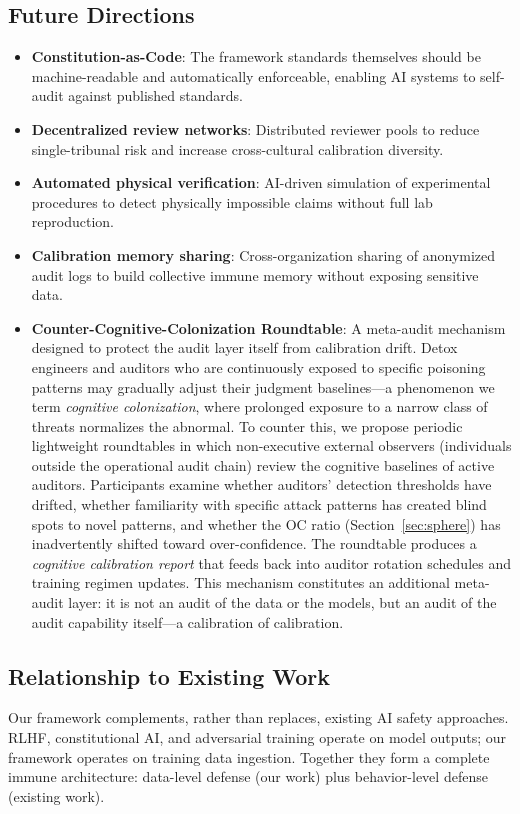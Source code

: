 \documentclass[11pt]{article}
\begin{document}
\subsection{Future Directions}
\begin{itemize}
  \item \textbf{Constitution-as-Code}: The framework standards themselves should be 
    machine-readable and automatically enforceable, enabling AI systems to self-audit 
    against published standards.
  \item \textbf{Decentralized review networks}: Distributed reviewer pools to reduce 
    single-tribunal risk and increase cross-cultural calibration diversity.
  \item \textbf{Automated physical verification}: AI-driven simulation of experimental 
    procedures to detect physically impossible claims without full lab reproduction.
  \item \textbf{Calibration memory sharing}: Cross-organization sharing of anonymized 
    audit logs to build collective immune memory without exposing sensitive data.
  \item \textbf{Counter-Cognitive-Colonization Roundtable}: A meta-audit mechanism 
    designed to protect the audit layer itself from calibration drift. Detox engineers 
    and auditors who are continuously exposed to specific poisoning patterns may 
    gradually adjust their judgment baselines—a phenomenon we term 
    \textit{cognitive colonization}, where prolonged exposure to a narrow class of 
    threats normalizes the abnormal. To counter this, we propose periodic lightweight 
    roundtables in which non-executive external observers (individuals outside the 
    operational audit chain) review the cognitive baselines of active auditors. 
    Participants examine whether auditors' detection thresholds have drifted, whether 
    familiarity with specific attack patterns has created blind spots to novel patterns, 
    and whether the OC ratio (Section~\ref{sec:sphere}) has inadvertently shifted 
    toward over-confidence. The roundtable produces a \textit{cognitive calibration 
    report} that feeds back into auditor rotation schedules and training regimen 
    updates. This mechanism constitutes an additional meta-audit layer: it is not 
    an audit of the data or the models, but an audit of the audit capability itself—a 
    calibration of calibration.
\end{itemize}

\subsection{Relationship to Existing Work}
Our framework complements, rather than replaces, existing AI safety approaches. RLHF, 
constitutional AI, and adversarial training operate on model outputs; our framework 
operates on training data ingestion. Together they form a complete immune architecture: 
data-level defense (our work) plus behavior-level defense (existing work).
\end{document}
